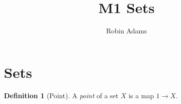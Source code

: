 \documentclass{article}
\title{M1 Sets}
\author{Robin Adams}
\theoremstyle{definition}
\newtheorem{definition}[axiom]{Definition}
\begin{document}
\maketitle
\tableofcontents

\section{Sets}

\begin{definition}[Point]
    A \emph{point} of a set $X$ is a map $1 \rightarrow X$.
\end{definition}
\end{document}
